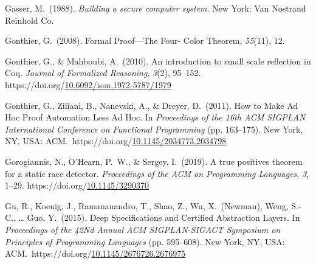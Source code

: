 \documentclass[12pt,twoside]{article}
\begin{document}
{\begin{thebibliography}{222}
\mdbibitemlabel{[Gasser, 1988]}Gasser, M.~(1988). \emph{Building a secure computer system}. New York: Van Nostrand Reinhold Co.\label{gasser_building_1988}%

\mdbibitemlabel{[Gonthier, 2008]}Gonthier, G.~(2008). Formal Proof—The Four- Color Theorem, \emph{55}(11), 12.\label{gonthier_formal_2008}%

Gonthier, G., \& Mahboubi, A.~(2010). An introduction to small scale reflection in Coq. \emph{Journal of Formalized Reasoning}, \emph{3}(2), 95–152. https://doi.org/\href{https://dx.doi.org/10.6092/issn.1972-5787/1979}{10.6092/issn.1972-5787/1979}\label{gonthier_introduction_2010}%

Gonthier, G., Ziliani, B., Nanevski, A., \& Dreyer, D.~(2011). How to Make Ad Hoc Proof Automation Less Ad Hoc. In \emph{Proceedings of the 16th ACM SIGPLAN International Conference on Functional Programming} (pp. 163–175). New York, NY, USA: ACM.~https://doi.org/\href{https://dx.doi.org/10.1145/2034773.2034798}{10.1145/2034773.2034798}\label{gonthier_how_2011}%

Gorogiannis, N., O’Hearn, P.~W., \& Sergey, I.~(2019). A true positives theorem for a static race detector. \emph{Proceedings of the ACM on Programming Languages}, \emph{3}, 1–29. https://doi.org/\href{https://dx.doi.org/10.1145/3290370}{10.1145/3290370}\label{gorogiannis_true_2019}%

\mdbibitemlabel{[Gu et al., 2015]}Gu, R., Koenig, J., Ramananandro, T., Shao, Z., Wu, X.~(Newman), Weng, S.-C., … Guo, Y.~(2015). Deep Specifications and Certified Abstraction Layers. In \emph{Proceedings of the 42Nd Annual ACM SIGPLAN-SIGACT Symposium on Principles of Programming Languages} (pp. 595–608). New York, NY, USA: ACM.~https://doi.org/\href{https://dx.doi.org/10.1145/2676726.2676975}{10.1145/2676726.2676975}\label{gu_deep_2015}%


\end{thebibliography}}
\end{document}
